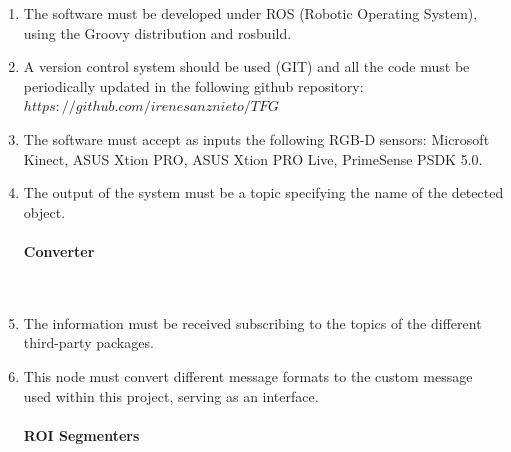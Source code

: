 \begin{enumerate}[label=\textbf{FR\threedigits*}, leftmargin=2cm]

	\item The software must be developed under ROS (Robotic Operating System), using the Groovy distribution and rosbuild.
	\item A version control system should be used (GIT) and all the code must be periodically updated in the following github repository:  $https://github.com/irenesanznieto/TFG$
	\item The software must accept as inputs the following RGB-D sensors: Microsoft Kinect, ASUS Xtion PRO, ASUS Xtion PRO Live, PrimeSense PSDK 5.0.
	\item The output of the system must be a topic specifying the name of the detected object. 
 
 
\paragraph{Converter} \mbox{}\\

\item The information must be received subscribing to the topics of the different third-party packages. 
\item This node must convert different message formats to the custom message used within this project, serving as an interface. 


\paragraph{ROI Segmenters}\mbox{}\\


\end{enumerate}
